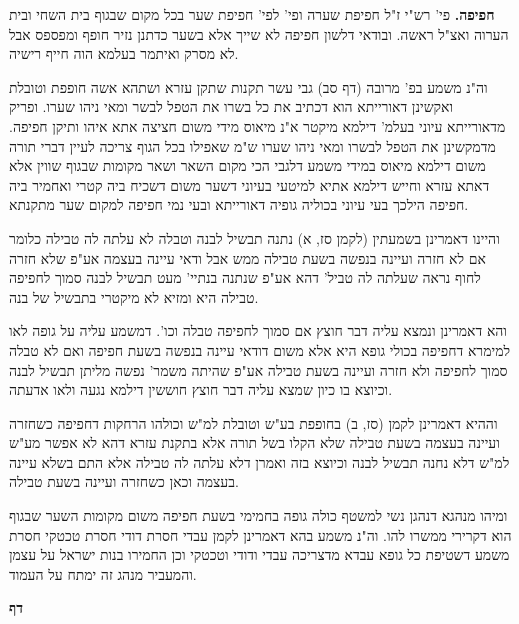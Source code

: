 \documentclass[12pt, openany]{book}
\newcommand{\sethebfont}{
\fontsize{10.5pt}{21.0pt} \selectfont
}
\newcommand{\twocol}[1]{
	{\sethebfont \begin{multicols}{2}
			#1
	\end{multicols}}	
}
\newcommand{\chapname}{}
\newcommand{\newchap}[1]{
	\addcontentsline{toc}{chapter}{#1}
	\renewcommand{\chapname}{#1}
		\begin{center}
			\textbf{%
\fontsize{16pt}{16pt}\selectfont
				#1}
		\end{center}
}
\begin{document}
\twocol{\textbf{חפיפה.}  פי' רש"י ז"ל חפיפת שערה ופי' לפי' חפיפת שער בכל מקום שבגוף בית השחי ובית הערוה ואצ"ל ראשה. ובודאי דלשון חפיפה לא שייך אלא בשער כדתנן נזיר חופף ומפספס אבל לא מסרק ואיתמר בעלמא הוה חייף רישיה.\par וה"נ משמע בפ' מרובה (דף סב) גבי עשר תקנות שתקן עזרא ושתהא אשה חופפת וטובלת ואקשינן דאורייתא הוא דכתיב את כל בשרו את הטפל לבשר ומאי ניהו שערו. ופריק מדאורייתא עיוני בעלמ' דילמא מיקטר א"נ מיאוס מידי משום חציצה אתא איהו ותיקן חפיפה. מדמקשינן את הטפל לבשרו ומאי ניהו שערו ש"מ שאפילו בכל הגוף צריכה לעיין דברי תורה משום דילמא מיאוס במידי משמע דלגבי הכי מקום השאר ושאר מקומות שבגוף שווין אלא דאתא עזרא וחייש דילמא אתיא למיטעי בעיוני דשער משום דשכיח ביה קטרי ואחמיר ביה חפיפה הילכך בעי עיוני בכוליה גופיה דאורייתא ובעי נמי חפיפה למקום שער מתקנתא.\par  והיינו דאמרינן בשמעתין (לקמן סז, א) נתנה תבשיל לבנה וטבלה לא עלתה לה טבילה כלומר אם לא חזרה ועיינה בנפשה בשעת טבילה ממש אבל ודאי עיינה בעצמה אע"פ שלא חזרה לחוף נראה שעלתה לה טביל' דהא אע"פ שנתנה בנתיי' מעט תבשיל לבנה סמוך לחפיפה טבילה היא ומזיא לא מיקטרי בתבשיל של בנה.\par והא דאמרינן ונמצא עליה דבר חוצץ אם סמוך לחפיפה טבלה וכו'. דמשמע עליה על גופה לאו למימרא דחפיפה בכולי גופא היא אלא משום דודאי עיינה בנפשה בשעת חפיפה ואם לא טבלה סמוך לחפיפה ולא חזרה ועיינה בשעת טבילה אע"פ שהיתה משמר' נפשה מליתן תבשיל לבנה וכיוצא בו כיון שמצא עליה דבר חוצץ חוששין דילמא נגעה ולאו אדעתה.\par  וההיא דאמרינן לקמן (סז, ב) בחופפת בע"ש וטובלת למ"ש וכולהו הרחקות דחפיפה כשחזרה ועיינה בעצמה בשעת טבילה שלא הקלו בשל תורה אלא בתקנת עזרא דהא לא אפשר מע"ש למ"ש דלא נחנה תבשיל לבנה וכיוצא בזה ואמרן דלא עלתה לה טבילה אלא התם בשלא עיינה בעצמה וכאן כשחזרה ועיינה בשעת טבילה.\par  ומיהו מנהגא דנהגן נשי למשטף כולה גופה בחמימי בשעת חפיפה משום מקומות השער שבגוף הוא דקרירי ממשרו להו. וה"נ משמע בהא דאמרינן לקמן עבדי חסרת דודי חסרת טכטקי חסרת משמע דשטיפת כל גופא עבדא מדצריכה עבדי ודודי וטכטקי וכן החמירו בנות ישראל על עצמן והמעביר מנהג זה ימתח על העמוד. 
\par}
\newchap{דף }
\end{document}

